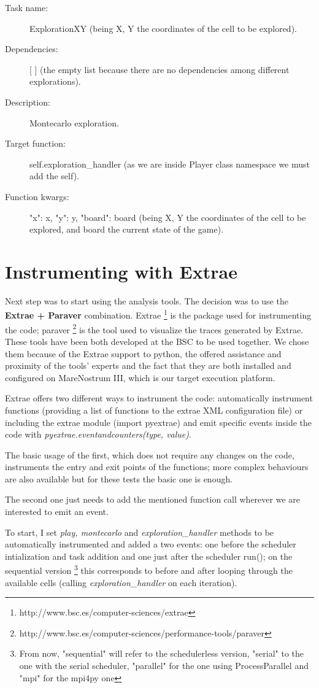 \begin{description}
\item [Task name:] ExplorationXY (being X, Y the coordinates of the cell to be explored).
\item [Dependencies:] [ ] (the empty list because there are no dependencies among different explorations).
\item [Description:] Montecarlo exploration.
\item [Target function:] self.exploration\_handler (as we are inside Player class namespace we must add the self).
\item [Function kwargs:] {"x": x, "y": y, "board": board} (being X, Y the coordinates of the cell to be explored, and board the current state of the game).
\end{description}

\section{Instrumenting with Extrae}

Next step was to start using the analysis tools. The decision was to use the  \textbf{Extrae + Paraver} combination. Extrae \footnote{http://www.bsc.es/computer-sciences/extrae} is the package used for instrumenting the code; paraver \footnote{http://www.bsc.es/computer-sciences/performance-tools/paraver} is the tool used to visualize the traces generated by Extrae. These tools have been both developed at the BSC to be used together. We chose them because of the Extrae support to python, the offered assistance and proximity of the tools' experts and the fact that they are both installed and configured on MareNostrum III, which is our target execution platform.

Extrae offers two different ways to instrument the code: automatically instrument functions (providing a list of functions to the extrae XML configuration file) or including the extrae module (import pyextrae)  and emit specific events inside the code with \textit{pyextrae.eventandcounters(type, value)}. 

The basic usage of the first, which  does not require any changes on the code, instruments the entry and exit points of the functions; more complex behaviours are also available but for these tests the basic one is enough. 

The second one just needs to add the mentioned function call wherever we are interested to emit an event.

To start, I set \textit{play, montecarlo} and \textit{exploration\_handler} methods to be automatically instrumented and added a two events: one before the scheduler intialization and task addition and one just after the scheduler run(); on the sequential version \footnote{ From now, "sequential" will refer to the schedulerless version, "serial" to the one with the serial scheduler, "parallel" for the one using ProcessParallel and "mpi" for the mpi4py one} this corresponds to before and after looping through the available cells (calling \textit{exploration\_handler} on each iteration).

